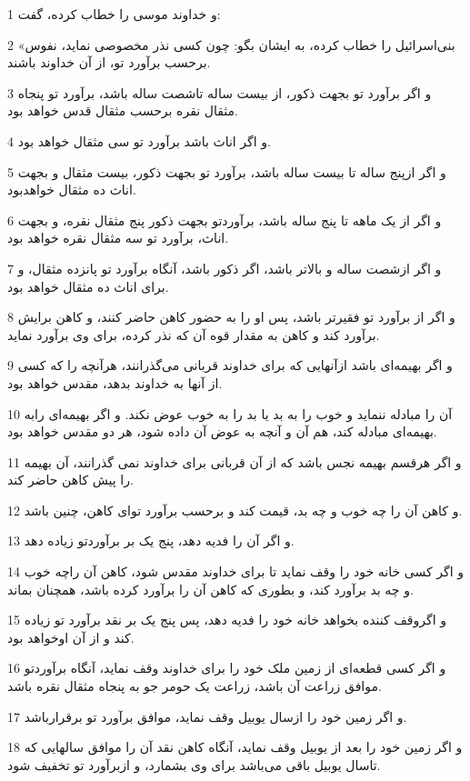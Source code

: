\par 1 و خداوند موسی را خطاب کرده، گفت:
\par 2 «بنی‌اسرائیل را خطاب کرده، به ایشان بگو: چون کسی نذر مخصوصی نماید، نفوس برحسب برآورد تو، از آن خداوند باشند.
\par 3 و اگر برآورد تو بجهت ذکور، از بیست ساله تاشصت ساله باشد، برآورد تو پنجاه مثقال نقره برحسب مثقال قدس خواهد بود.
\par 4 و اگر اناث باشد برآورد تو سی مثقال خواهد بود.
\par 5 و اگر ازپنج ساله تا بیست ساله باشد، برآورد تو بجهت ذکور، بیست مثقال و بجهت اناث ده مثقال خواهدبود.
\par 6 و اگر از یک ماهه تا پنج ساله باشد، برآوردتو بجهت ذکور پنج مثقال نقره، و بجهت اناث، برآورد تو سه مثقال نقره خواهد بود.
\par 7 و اگر ازشصت ساله و بالاتر باشد، اگر ذکور باشد، آنگاه برآورد تو پانزده مثقال، و برای اناث ده مثقال خواهد بود.
\par 8 و اگر از برآورد تو فقیرتر باشد، پس او را به حضور کاهن حاضر کنند، و کاهن برایش برآورد کند و کاهن به مقدار قوه آن که نذر کرده، برای وی برآورد نماید.
\par 9 و اگر بهیمه‌ای باشد ازآنهایی که برای خداوند قربانی می‌گذرانند، هرآنچه را که کسی از آنها به خداوند بدهد، مقدس خواهد بود.
\par 10 آن را مبادله ننماید و خوب را به بد یا بد را به خوب عوض نکند. و اگر بهیمه‌ای رابه بهیمه‌ای مبادله کند، هم آن و آنچه به عوض آن داده شود، هر دو مقدس خواهد بود.
\par 11 و اگر هرقسم بهیمه نجس باشد که از آن قربانی برای خداوند نمی گذرانند، آن بهیمه را پیش کاهن حاضر کند.
\par 12 و کاهن آن را چه خوب و چه بد، قیمت کند و برحسب برآورد تو‌ای کاهن، چنین باشد.
\par 13 و اگر آن را فدیه دهد، پنج یک بر برآوردتو زیاده دهد.
\par 14 و اگر کسی خانه خود را وقف نماید تا برای خداوند مقدس شود، کاهن آن راچه خوب و چه بد برآورد کند، و بطوری که کاهن آن را برآورد کرده باشد، همچنان بماند.
\par 15 و اگروقف کننده بخواهد خانه خود را فدیه دهد، پس پنج یک بر نقد برآورد تو زیاده کند و از آن اوخواهد بود.
\par 16 و اگر کسی قطعه‌ای از زمین ملک خود را برای خداوند وقف نماید، آنگاه برآوردتو موافق زراعت آن باشد، زراعت یک حومر جو به پنجاه مثقال نقره باشد.
\par 17 و اگر زمین خود را ازسال یوبیل وقف نماید، موافق برآورد تو برقرارباشد.
\par 18 و اگر زمین خود را بعد از یوبیل وقف نماید، آنگاه کاهن نقد آن را موافق سالهایی که تاسال یوبیل باقی می‌باشد برای وی بشمارد، و ازبرآورد تو تخفیف شود.
